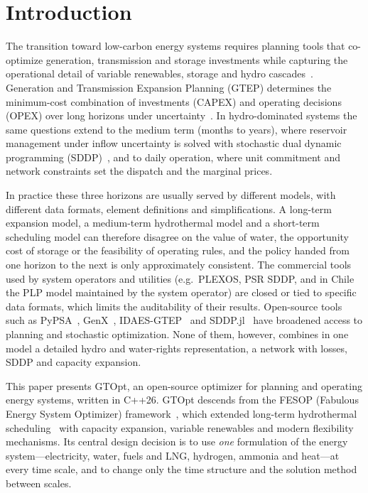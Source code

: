 
\section{Introduction}
\label{sec:introduction}

The transition toward low-carbon energy systems requires planning tools
that co-optimize generation, transmission and storage investments while
capturing the operational detail of variable renewables, storage and
hydro cascades~\cite{lumbreras2016progressive}.  Generation and
Transmission Expansion Planning (GTEP) determines the minimum-cost
combination of investments (CAPEX) and operating decisions (OPEX) over
long horizons under
uncertainty~\cite{hemmati2013comprehensive, mahdavi2019tep_survey}.
In hydro-dominated systems the same questions extend to the medium term
(months to years), where reservoir management under inflow uncertainty
is solved with stochastic dual dynamic programming
(SDDP)~\cite{pereira1991sddp}, and to daily operation, where unit
commitment and network constraints set the dispatch and the marginal
prices.

In practice these three horizons are usually served by different
models, with different data formats, element definitions and
simplifications.  A long-term expansion model, a medium-term
hydrothermal model and a short-term scheduling model can therefore
disagree on the value of water, the opportunity cost of storage or the
feasibility of operating rules, and the policy handed from one horizon
to the next is only approximately consistent.  The commercial tools used
by system operators and utilities (e.g.\ PLEXOS, PSR SDDP, and in Chile
the PLP model maintained by the system operator) are closed or tied to
specific data formats, which limits the auditability of their results.
Open-source tools such as PyPSA~\cite{brown2018pypsa},
GenX~\cite{jenkins2017genx}, IDAES-GTEP~\cite{idaes_gtep2024} and
SDDP.jl~\cite{dowson2020sddp_jl} have broadened access to planning and
stochastic optimization.  None of them, however, combines in
one model a detailed hydro and water-rights representation, a network
with losses, SDDP and capacity expansion.

This paper presents GTOpt, an open-source optimizer for planning and
operating energy systems, written in C++26.  GTOpt descends from the
FESOP (Fabulous Energy System Optimizer)
framework~\cite{buitrago2022fesop}, which extended long-term
hydrothermal scheduling~\cite{pereira2016hydrothermal} with capacity
expansion, variable renewables and modern flexibility mechanisms.  Its
central design decision is to use \emph{one} formulation of the energy
system---electricity, water, fuels and LNG, hydrogen, ammonia and
heat---at every time scale, and to change only the time structure and
the solution method between scales.


